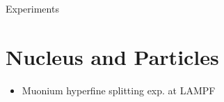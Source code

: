 Experiments

\section{Nucleus and Particles}
\begin{itemize}
    \item Muonium  hyperfine splitting exp. at LAMPF
\end{itemize}
